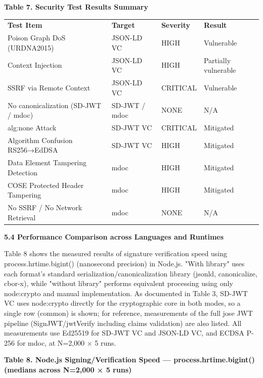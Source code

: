 \textbf{Table 7. Security Test Results Summary}

\begin{longtable}[]{@{}llll@{}}
\toprule
\endhead
\textbf{Test Item} & \textbf{Target} & \textbf{Severity} & \textbf{Result}\tabularnewline
Poison Graph DoS (URDNA2015) & JSON-LD VC & HIGH & Vulnerable\tabularnewline
Context Injection & JSON-LD VC & HIGH & Partially vulnerable\tabularnewline
SSRF via Remote Context & JSON-LD VC & CRITICAL & Vulnerable\tabularnewline
No canonicalization (SD-JWT / mdoc) & SD-JWT / mdoc & NONE & N/A\tabularnewline
alg:none Attack & SD-JWT VC & CRITICAL & Mitigated\tabularnewline
Algorithm Confusion RS256→EdDSA & SD-JWT VC & HIGH & Mitigated\tabularnewline
Data Element Tampering Detection & mdoc & HIGH & Mitigated\tabularnewline
COSE Protected Header Tampering & mdoc & HIGH & Mitigated\tabularnewline
No SSRF / No Network Retrieval & mdoc & NONE & N/A\tabularnewline
\bottomrule
\end{longtable}

\textbf{5.4 Performance Comparison across Languages and Runtimes}

Table 8 shows the measured results of signature verification speed using process.hrtime.bigint() (nanosecond precision) in Node.js. "With library" uses each format's standard serialization/canonicalization library (jsonld, canonicalize, cbor-x), while "without library" performs equivalent processing using only node:crypto and manual implementation. As documented in Table 3, SD-JWT VC uses node:crypto directly for the cryptographic core in both modes, so a single row (common) is shown; for reference, measurements of the full jose JWT pipeline (SignJWT/jwtVerify including claims validation) are also listed. All measurements use Ed25519 for SD-JWT VC and JSON-LD VC, and ECDSA P-256 for mdoc, at N=2,000 × 5 runs.

\textbf{Table 8. Node.js Signing/Verification Speed --- process.hrtime.bigint() (medians across N=2,000 × 5 runs)}

